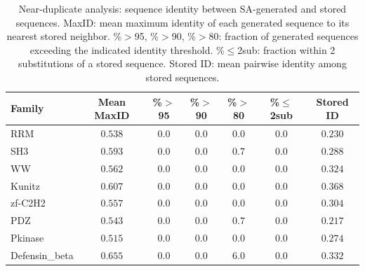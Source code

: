 \documentclass[10pt]{article}
\begin{document}
\begin{table}[ht]
\centering
\caption{Near-duplicate analysis: sequence identity between SA-generated and stored sequences. MaxID: mean maximum identity of each generated sequence to its nearest stored neighbor. \%$>$95, \%$>$90, \%$>$80: fraction of generated sequences exceeding the indicated identity threshold. \%$\leq$2sub: fraction within 2 substitutions of a stored sequence. Stored ID: mean pairwise identity among stored sequences.}
\label{tab:identity-dist}
\small
\begin{tabular}{@{}lcccccc@{}}
\toprule
Family & Mean MaxID & \%$>$95 & \%$>$90 & \%$>$80 & \%$\leq$2sub & Stored ID \\
\midrule
RRM            & $0.538$ & $0.0$ & $0.0$ & $0.0$ & $0.0$ & $0.230$ \\
SH3            & $0.593$ & $0.0$ & $0.0$ & $0.7$ & $0.0$ & $0.288$ \\
WW             & $0.562$ & $0.0$ & $0.0$ & $0.0$ & $0.0$ & $0.324$ \\
Kunitz         & $0.607$ & $0.0$ & $0.0$ & $0.0$ & $0.0$ & $0.368$ \\
zf-C2H2        & $0.557$ & $0.0$ & $0.0$ & $0.0$ & $0.0$ & $0.304$ \\
PDZ            & $0.543$ & $0.0$ & $0.0$ & $0.7$ & $0.0$ & $0.217$ \\
Pkinase        & $0.515$ & $0.0$ & $0.0$ & $0.0$ & $0.0$ & $0.274$ \\
Defensin\_beta & $0.655$ & $0.0$ & $0.0$ & $6.0$ & $0.0$ & $0.332$ \\
\bottomrule
\end{tabular}
\end{table}
\end{document}
